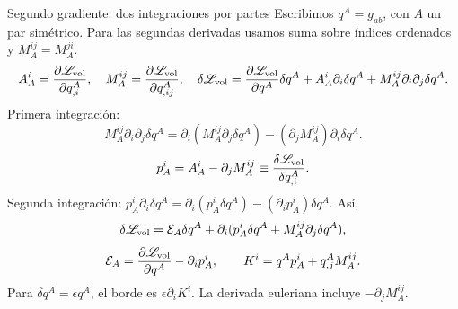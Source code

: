 \begin{frame}[label=holo-ll-07]{Segundo gradiente: dos integraciones por partes}
\footnotesize
Escribimos $q^A=g_{ab}$, con $A$ un par simétrico. Para las segundas derivadas usamos suma sobre índices ordenados y $M_A^{ij}=M_A^{ji}$.
\[
A_A^i=\frac{\partial\mathscr L_{\rm vol}}{\partial q^A_{,i}},\quad
M_A^{ij}=\frac{\partial\mathscr L_{\rm vol}}{\partial q^A_{,ij}},\quad
\delta\mathscr L_{\rm vol}=\frac{\partial\mathscr L_{\rm vol}}{\partial q^A}\delta q^A
+A_A^i\partial_i\delta q^A+M_A^{ij}\partial_i\partial_j\delta q^A.
\]
Primera integración:
\[
M_A^{ij}\partial_i\partial_j\delta q^A
=\partial_i(M_A^{ij}\partial_j\delta q^A)-(\partial_jM_A^{ij})\partial_i\delta q^A.
\]
\begin{equation}
p_A^i=A_A^i-\partial_jM_A^{ij}
\equiv\frac{\delta\mathscr L_{\rm vol}}{\delta q^A_{,i}}.
\label{eq:holo-euler-momentum}
\end{equation}
Segunda integración: $p_A^i\partial_i\delta q^A=\partial_i(p_A^i\delta q^A)-(\partial_i p_A^i)\delta q^A$. Así,
\begin{equation}
\delta\mathscr L_{\rm vol}=\mathcal E_A\delta q^A
+\partial_i(p_A^i\delta q^A+M_A^{ij}\partial_j\delta q^A),
\label{eq:holo-second-variation}
\end{equation}
\[
\mathcal E_A=\frac{\partial\mathscr L_{\rm vol}}{\partial q^A}-\partial_i p_A^i,
\qquad K^i=q^Ap_A^i+q^A_{,j}M_A^{ij}.
\]
Para $\delta q^A=\epsilon q^A$, el borde es $\epsilon\partial_iK^i$.
La derivada euleriana incluye $-\partial_jM_A^{ij}$.
\end{frame}
